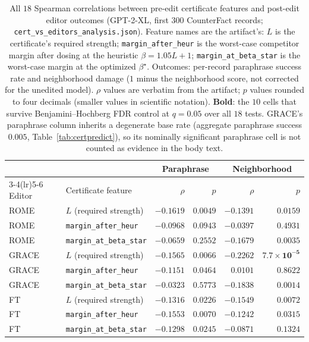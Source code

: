 \documentclass[10pt,twocolumn]{article}
\theoremstyle{remark}
\begin{document}
\begin{table}[t]
\centering\small
\begin{tabular}{l l r r r r}
\toprule
& & \multicolumn{2}{c}{Paraphrase} & \multicolumn{2}{c}{Neighborhood} \\
\cmidrule(lr){3-4}\cmidrule(lr){5-6}
Editor & Certificate feature & $\rho$ & $p$ & $\rho$ & $p$ \\
\midrule
ROME  & $L$ (required strength) & $\mathbf{-0.1619}$ & $\mathbf{0.0049}$ & $\mathbf{-0.1391}$ & $\mathbf{0.0159}$ \\
ROME  & \texttt{margin\_after\_heur} & $-0.0968$ & $0.0943$ & $-0.0397$ & $0.4931$ \\
ROME  & \texttt{margin\_at\_beta\_star} & $-0.0659$ & $0.2552$ & $\mathbf{-0.1679}$ & $\mathbf{0.0035}$ \\
\addlinespace
GRACE & $L$ (required strength) & $\mathbf{-0.1565}$ & $\mathbf{0.0066}$ & $\mathbf{-0.2262}$ & $\mathbf{7.7\times10^{-5}}$ \\
GRACE & \texttt{margin\_after\_heur} & $-0.1151$ & $0.0464$ & $0.0101$ & $0.8622$ \\
GRACE & \texttt{margin\_at\_beta\_star} & $-0.0323$ & $0.5773$ & $\mathbf{-0.1838}$ & $\mathbf{0.0014}$ \\
\addlinespace
FT    & $L$ (required strength) & $\mathbf{-0.1316}$ & $\mathbf{0.0226}$ & $\mathbf{-0.1549}$ & $\mathbf{0.0072}$ \\
FT    & \texttt{margin\_after\_heur} & $\mathbf{-0.1553}$ & $\mathbf{0.0070}$ & $-0.1242$ & $0.0315$ \\
FT    & \texttt{margin\_at\_beta\_star} & $\mathbf{-0.1298}$ & $\mathbf{0.0245}$ & $-0.0871$ & $0.1324$ \\
\bottomrule
\end{tabular}
\caption{All $18$ Spearman correlations between pre-edit certificate features
and post-edit editor outcomes (GPT-2-XL, first $300$ CounterFact records;
\texttt{cert\_vs\_editors\_analysis.json}). Feature names are the artifact's:
$L$ is the certificate's required strength;
\texttt{margin\_after\_heur} is the worst-case competitor margin after dosing
at the heuristic $\beta=1.05L+1$; \texttt{margin\_at\_beta\_star} is the
worst-case margin at the optimized $\beta^{\star}$. Outcomes: per-record
paraphrase success rate and neighborhood damage ($1$ minus the neighborhood
score, not corrected for the unedited model). $\rho$ values are
verbatim from the artifact; $p$ values rounded to four decimals (smaller
values in scientific notation).
\textbf{Bold}: the $10$ cells that survive Benjamini--Hochberg FDR control at
$q=0.05$ over all $18$ tests. GRACE's paraphrase column inherits a degenerate
base rate (aggregate paraphrase success $0.005$,
Table~\ref{tab:certpredict}), so its nominally significant paraphrase cell is
not counted as evidence in the body text.}
\label{tab:certpredict18}
\end{table}
\end{document}

